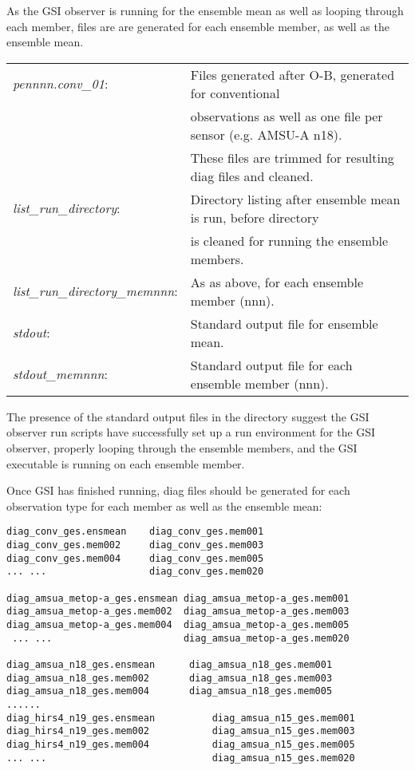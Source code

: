 As the GSI observer is running for the ensemble mean as well as looping through each member, files are are generated for each ensemble member, as well as the ensemble mean.
\begin{table}[htbp]
\centering
\begin{tabular}{ll}
\textit{pennnn.conv\_01}: & Files generated after O-B, generated for conventional  \\
                                         & observations as well as one file per sensor (e.g. AMSU-A n18).   \\
                                         & These files are trimmed for resulting diag files and cleaned.\\
\textit{list\_run\_directory}: & Directory listing after ensemble mean is run, before directory \\
                                          & is cleaned for running the ensemble members.\\
\textit{list\_run\_directory\_memnnn}:  & As as above, for each ensemble member (nnn).\\
\textit{stdout}:  &  Standard output file for ensemble mean.\\                                                  
\textit{stdout\_memnnn}: & Standard output file for each ensemble member (nnn).\\
\end{tabular}
\end{table}

The presence of the standard output files in the directory suggest the GSI observer run scripts have successfully set up a run environment for the GSI observer, properly looping through the ensemble members, and the GSI executable is running on each ensemble member. 

Once GSI has finished running, diag files should be generated for each observation type for each member as well as the ensemble mean:
\begin{footnotesize}
\begin{verbatim}
diag_conv_ges.ensmean    diag_conv_ges.mem001
diag_conv_ges.mem002     diag_conv_ges.mem003
diag_conv_ges.mem004     diag_conv_ges.mem005
... ...                  diag_conv_ges.mem020

diag_amsua_metop-a_ges.ensmean diag_amsua_metop-a_ges.mem001
diag_amsua_metop-a_ges.mem002  diag_amsua_metop-a_ges.mem003
diag_amsua_metop-a_ges.mem004  diag_amsua_metop-a_ges.mem005
 ... ...                       diag_amsua_metop-a_ges.mem020

diag_amsua_n18_ges.ensmean      diag_amsua_n18_ges.mem001
diag_amsua_n18_ges.mem002       diag_amsua_n18_ges.mem003
diag_amsua_n18_ges.mem004       diag_amsua_n18_ges.mem005
......
diag_hirs4_n19_ges.ensmean          diag_amsua_n15_ges.mem001
diag_hirs4_n19_ges.mem002           diag_amsua_n15_ges.mem003
diag_hirs4_n19_ges.mem004           diag_amsua_n15_ges.mem005
... ...                             diag_amsua_n15_ges.mem020

\end{verbatim}
\end{footnotesize}



